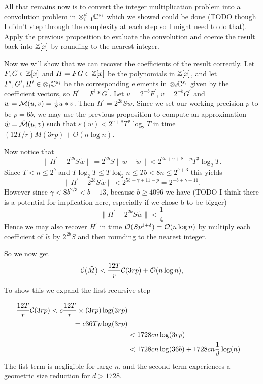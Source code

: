 
All that remains now is to convert the integer multiplication problem into a convolution problem in $\otimes_{i=1}^d {\mathbb C}^{s_i}$ which we showed could be done (TODO though I didn't step through the complexity at each step so I might need to do that). Apply the previous proposition to evaluate the convolution and coerce the result back into ${\mathbb Z}[x]$ by rounding to the nearest integer.

Now we will show that we can recover the coefficients of the result correctly.
Let $F, G \in {\mathbb Z}[x]$ and $H = FG \in {\mathbb Z}[x]$ be the polynomials in ${\mathbb Z}[x]$, and let $F^\prime, G^\prime, H^\prime \in \otimes_i {\mathbb C}^{s_i}$ be the corresponding elements in $\otimes_i {\mathbb C}^{s_i}$ given by the coefficient vectors, so $H^\prime = F^\prime \ast G^\prime$. Let $u = 2^{-b}F^\prime$, $v = 2^{-b} G^\prime$ and $w = \mathcal M(u, v) = \frac{1}{S} u \ast v$. Then $H^\prime = 2^{2b}Sw$. Since we set our working precision $p$ to be $p = 6b$, we may use the previous proposition to compute an approximation $\tilde{w} = \tilde{\mathcal M}(u, v)$ such that $\varepsilon(\tilde{w}) < 2^{\gamma + 8} T^2 \log_2 T$ in time $(12T/r)M(3rp) + O(n \log n)$.

Now notice that
\[
    \|H^\prime - 2^{2b}S\tilde{w}\| = 2^{2b}S\|w - \tilde{w}\| < 2^{2b + \gamma + 8 - p} T^3 \log_2 T.
\]
Since $T < n \le 2^b$ and $T \log _2 T \le T \log_2 n \le Tb < 8n \le 2^{b+3}$ this yields
\[
    \|H^\prime - 2^{2b}S\tilde{w}\| < 2^{5b + \gamma + 11 - p} = 2^{-b + \gamma + 11}.
\]
However since $\gamma < 8b^{2/3} < b - 13$, because $b \ge 4096$ we have (TODO I think there is a potential for implication here, especially if we chose b to be bigger)
\[
    \| H^\prime - 2^{2b}S \tilde{w} \| < \frac{1}{4}
\]
Hence we may also recover $H^\prime$ in time $\mathcal O(Sp^{1 + \delta}) = \mathcal O(n \log n)$ by multiply each coefficient of $\tilde{w}$ by $2^{2b}S$ and then rounding to the nearest integer.

So we now get
    \[
        \mathcal C(\tilde{M}) < \frac{12T}{r} \mathcal C(3rp) + \mathcal O(n \log n),
    \]

    To show this we expand the first recursive step

    \begin{align*}
        \frac{12T}{r} \mathcal C(3rp) < c\frac{12T}{r} \times (3rp) \log(3rp)\\
        = c36Tp\log (3rp)\\
        &< 1728cn \log (3rp)\\
        &< 1728cn\log(36b) + 1728cn \frac{1}{d}\log(n)\\
    \end{align*}
    The fist term is negligible for large $n$, and the second term experiences a geometric size reduction for $d > 1728$.

